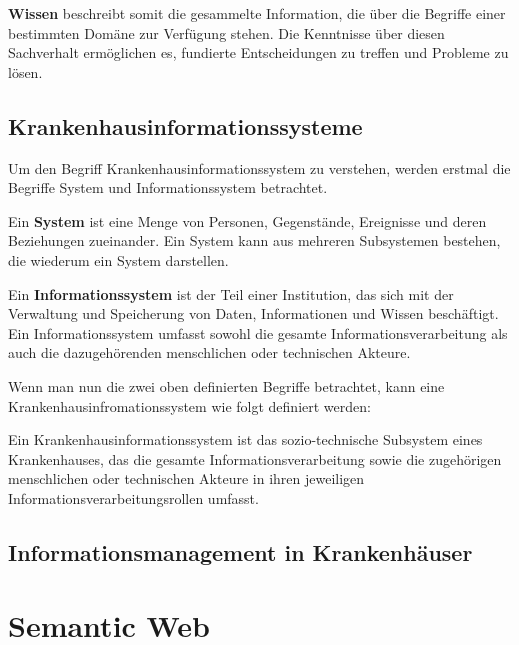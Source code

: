 \textbf{Wissen} beschreibt somit die gesammelte Information, die über die Begriffe einer bestimmten Domäne zur Verfügung stehen. 
Die Kenntnisse über diesen Sachverhalt ermöglichen es, fundierte Entscheidungen zu treffen und Probleme zu lösen.

\subsection{Krankenhausinformationssysteme}

Um den Begriff Krankenhausinformationssystem zu verstehen, werden erstmal die Begriffe System und Informationssystem betrachtet. \newline

Ein \textbf{System} ist eine Menge von Personen, Gegenstände, Ereignisse und deren Beziehungen zueinander. 
Ein System kann aus mehreren Subsystemen bestehen, die wiederum ein System darstellen. \citep[vgl.]{winter_health_2011} \newline

Ein \textbf{Informationssystem} ist der Teil einer Institution, das sich mit der Verwaltung und Speicherung von Daten, Informationen und Wissen beschäftigt.
Ein Informationssystem umfasst sowohl die gesamte Informationsverarbeitung als auch die dazugehörenden menschlichen oder technischen Akteure. \citep[vgl.]{winter_health_2011} \newline

Wenn man nun die zwei oben definierten Begriffe betrachtet, kann eine Krankenhausinfromationssystem wie folgt definiert werden:

\begin{definition}
	Ein Krankenhausinformationssystem ist das sozio-technische Subsystem eines Krankenhauses, das die gesamte Informationsverarbeitung sowie die zugehörigen menschlichen oder technischen Akteure in ihren jeweiligen Informationsverarbeitungsrollen umfasst. \citet{winter_health_2011}
\end{definition}

\subsection{Informationsmanagement in Krankenhäuser}



\section{Semantic Web}\label{sec:sw}


